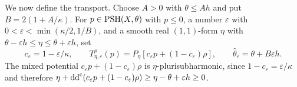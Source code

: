 We now define the transport. Choose $A>0$ with $\theta\leq Ah$ and put $B=2(1+A/\kappa)$. For $p\in\mathrm{PSH}(X,\theta)$ with $p\leq0$, a number $\varepsilon$ with $0<\varepsilon<\min(\kappa/2,1/B)$, and a smooth real $(1,1)$-form $\eta$ with $\theta-\varepsilon h\leq\eta\leq\theta+\varepsilon h$, set
\begin{equation}\label{eq:two-sided-model-transport}
 c_\varepsilon=1-\varepsilon/\kappa,\qquad
 T^\rho_{\eta,\varepsilon}(p)
   =P_\eta[c_\varepsilon p+(1-c_\varepsilon)\rho],\qquad
 \widehat\theta_\varepsilon=\theta+B\varepsilon h.
\end{equation}
The mixed potential $c_\varepsilon p+(1-c_\varepsilon)\rho$ is $\eta$-plurisubharmonic, since $1-c_\varepsilon=\varepsilon/\kappa$ and therefore $\eta+\mathrm{dd}^{\mathrm{c}}(c_\varepsilon p+(1-c_\varepsilon)\rho)\geq\eta-\theta+\varepsilon h\geq0$.

